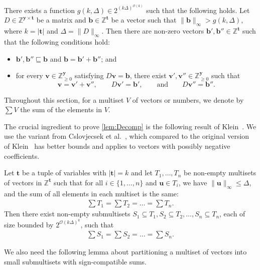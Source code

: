 \documentclass{article}
\renewcommand{\leq}{\leqslant}
\renewcommand{\geq}{\geqslant}
\newcommand{\cfleq}{\sqsubseteq}
\newcommand{\Z}{\mathbb{Z}}
\newcommand{\Zn}{\Z_{\geq 0}}
\newcommand{\tup}[1]{{\mathbf{#1}}}
\newcommand{\yy}{\tup y}
\newcommand{\tv}{\tup t}
\newcommand{\bb}{\tup b}
\newcommand{\uu}{\tup u}
\newcommand{\myvv}{\tup v} %
\newcommand{\matrices}[3]{#1^{#2\times #3}}
\newcommand{\Oh}{{\mathcal{O}}}
\begin{document}
\begin{lemma}\label{lem:Decomp}
There exists a function $g(k,\Delta)\in 2^{(k\Delta)^{\Oh(k)}}$ such that the following holds.
Let $D\in \matrices{\Z}{\yy}{\tv}$ be a matrix and $\bb\in \Z^{\tv}$ be a vector such that $\|\bb\|_\infty>g(k,\Delta)$,
 where $k=|\tv|$ and $\Delta=\|D\|_\infty$. Then there are non-zero vectors $\bb',\bb''\in \Z^\tv$ such that the following conditions hold:
\begin{itemize}[nosep]
    \item $\bb',\bb''\cfleq \bb$ and $\bb=\bb'+\bb''$; and
    \item for every $\myvv\in \Zn^{\yy}$ satisfying $D\myvv=\bb$, there exist $\myvv',\myvv''\in \Zn^{\yy}$ such that
    $$\myvv=\myvv'+\myvv'',\qquad D\myvv'=\bb',\qquad\textrm{and}\qquad  D\myvv''=\bb''.$$
\end{itemize}
\end{lemma}

Throughout this section, for a multiset $V$ of vectors or numbers, we denote by $\sum V$ the sum of the elements in $V$.

The crucial ingredient to prove \cref{lem:Decomp} is the following result of Klein~\cite{DBLP:journals/mp/Klein22}. We use the variant from Cslovjecsek et al.~\cite{CslovjecsekEPVW21}, which compared to the original version of Klein~\cite{DBLP:journals/mp/Klein22} has better bounds and applies to vectors with possibly negative coefficients.

\begin{lemma}[Klein Lemma, Theorem~4.1 of~\cite{CslovjecsekEPVW21} for $\epsilon=1$ and with adjusted notation]\label{lem:Klein}
Let $\tv$ be a tuple of variables with $|\tv|=k$ and let $T_1,\ldots,T_n$ be non-empty multisets of vectors in $\Z^{\tv}$ such that for all $i\in \{1,\ldots,n\}$ and $\uu\in T_i$, we have $\|\uu\|_\infty\leq \Delta$, and the sum of all elements in each multiset is the same:
\begin{align*}
    \sum T_1 =\sum T_2 = \ldots = \sum T_n.
\end{align*}
Then there exist non-empty submultisets $S_1 \subseteq T_1,S_2 \subseteq T_2,\ldots,S_n \subseteq T_n$, each of size bounded  by $2^{\Oh(k\Delta)^k}$, such that
\begin{align*}
    \sum S_1 =\sum S_2 = \ldots = \sum S_n.
\end{align*}
\end{lemma}

We also need the following lemma about partitioning a multiset of vectors into  small submultisets with sign-compatible sums.
\end{document}
